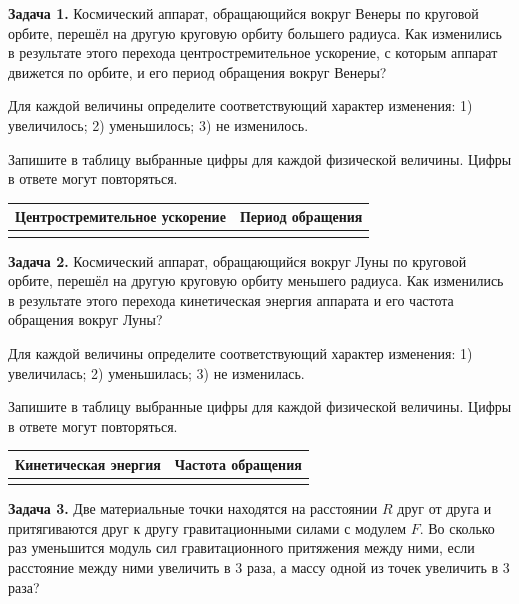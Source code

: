 \begin{taskbasic}[code={\label{task:gravity_v13_n6}}]
\textbf{Задача 1.} Космический аппарат, обращающийся вокруг Венеры по круговой орбите, перешёл на другую круговую орбиту большего радиуса. Как изменились в результате этого перехода центростремительное ускорение, с которым аппарат движется по орбите, и его период обращения вокруг Венеры?

Для каждой величины определите соответствующий характер изменения:
1) увеличилось;
2) уменьшилось;
3) не изменилось.

Запишите в таблицу выбранные цифры для каждой физической величины. Цифры в ответе могут повторяться.
\begin{center}
\begin{tabular}{|c|c|}
\hline
Центростремительное ускорение & Период обращения \\ \hline
 & \\ \hline
\end{tabular}
\end{center}

\end{taskbasic}

\begin{taskbasic}[code={\label{task:gravity_v14_n6}}]
\textbf{Задача 2.} Космический аппарат, обращающийся вокруг Луны по круговой орбите, перешёл на другую круговую орбиту меньшего радиуса. Как изменились в результате этого перехода кинетическая энергия аппарата и его частота обращения вокруг Луны?

Для каждой величины определите соответствующий характер изменения:
1) увеличилась;
2) уменьшилась;
3) не изменилась.

Запишите в таблицу выбранные цифры для каждой физической величины. Цифры в ответе могут повторяться.
\begin{center}
\begin{tabular}{|c|c|}
\hline
Кинетическая энергия & Частота обращения \\ \hline
 & \\ \hline
\end{tabular}
\end{center}

\end{taskbasic}

\begin{taskbasic}[code={\label{task:gravity_v15_n2}}]
\textbf{Задача 3.} Две материальные точки находятся на расстоянии $R$ друг от друга и притягиваются друг к другу гравитационными силами с модулем $F$. Во сколько раз уменьшится модуль сил гравитационного притяжения между ними, если расстояние между ними увеличить в $3$ раза, а массу одной из точек увеличить в $3$ раза?

\end{taskbasic}

